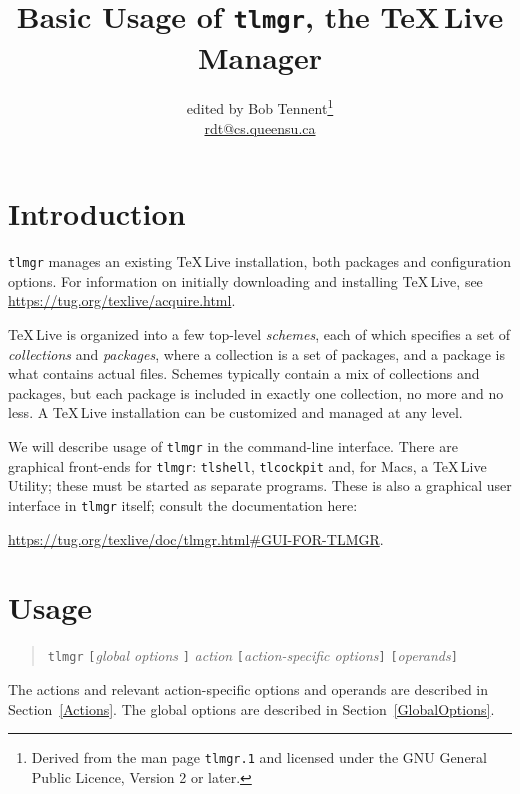 \documentclass[11pt]{article}
\title{Basic Usage of \texttt{tlmgr}, the \TeX\,Live Manager}
\author{edited by Bob Tennent\thanks{\scriptsize Derived
from the man page \texttt{tlmgr.1} and licensed under
the GNU General Public Licence, Version 2 or later.}\\
\url{rdt@cs.queensu.ca}}
\begin{document}
\maketitle
\thispagestyle{empty}


\tableofcontents

\clearpage

\section{Introduction}

\texttt{tlmgr} manages an existing \TeX\,Live installation,
both packages and configuration options. For information
on initially downloading and installing \TeX\,Live, see
\url{https://tug.org/texlive/acquire.html}.

\TeX\,Live is organized into a few top-level
\textit{schemes}, each of which specifies a set of
\textit{collections} and \textit{packages}, where a
collection is a set of packages, and a package is what
contains actual files. Schemes typically contain a mix of
collections and packages, but each package is included in
exactly one collection, no more and no less. A \TeX\,Live
installation can be customized and managed at any level.

We will describe usage of \texttt{tlmgr} in the
command-line interface. There are graphical front-ends
for \texttt{tlmgr}: \texttt{tlshell}, \texttt{tlcockpit}
and, for Macs, a \TeX\,Live Utility; these must
be started as separate programs. These is also a
graphical user interface in \texttt{tlmgr} itself;
consult the documentation here: 
\begin{center}
  \url{https://tug.org/texlive/doc/tlmgr.html#GUI-FOR-TLMGR}.
\end{center}



\section{Usage}

\begin{quote}
  \texttt{tlmgr} 
  \verb|[|\textit{global options} \verb|]| 
  \textit{action} 
  \verb|[|\textit{action-specific options}\verb|]|  
  \verb|[|\textit{operands}\verb|]|
\end{quote}

The actions and relevant action-specific options and
operands are described in Section~\ref{Actions}. The global
options are described in Section~\ref{GlobalOptions}.
\end{document}
